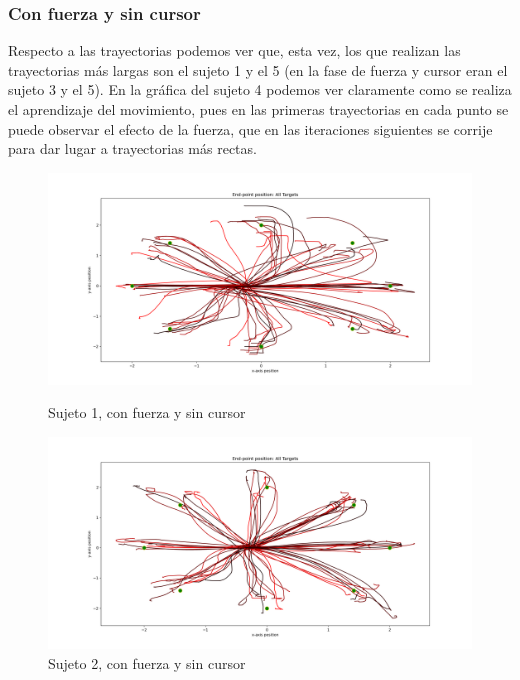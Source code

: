 \documentclass[a4paper,11pt, oneside]{book}
\begin{document}
\subsubsection{Con fuerza y sin cursor}

Respecto a las trayectorias podemos ver que, esta vez, los que realizan las trayectorias más largas son el sujeto 1 y el 5 (en la fase de fuerza y cursor eran el sujeto 3 y el 5). En la gráfica del sujeto 4 podemos ver claramente como se realiza el aprendizaje del movimiento, pues en las primeras trayectorias en cada punto se puede observar el efecto de la fuerza, que en las iteraciones siguientes se corrije para dar lugar a trayectorias más rectas.

\begin{figure}[H]
	\begin{minipage}[b]{0.5\linewidth}
		\centering
		\includegraphics[width=\linewidth]{sujeto1/force_no_cursor/trayectorias}
		\caption{Sujeto 1, con fuerza y sin cursor}
		\label{fig:figura1}
	\end{minipage}
	\hspace{0.5cm}
	\begin{minipage}[b]{0.5\linewidth}
		\centering
		\includegraphics[width=\linewidth]{sujeto2/force_no_cursor/trayectorias}
		\caption{Sujeto 2, con fuerza y sin cursor}
		\label{fig:figura2}
	\end{minipage}
\end{figure}
\end{document}
